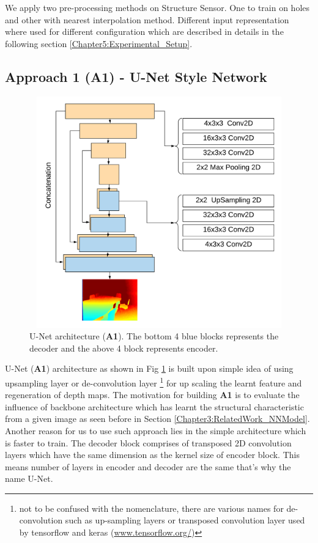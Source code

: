 We apply two pre-processing methods on Structure Sensor. One to train on holes and other with nearest interpolation method. Different input representation where used for different configuration which are described in details in the following section \ref{Chapter5:Experimental_Setup}.

\subsection{Approach 1 (A1) - U-Net Style Network}
\label{Chapter5:A1}
\begin{figure}[h]
    \centering
    \includegraphics[width = 12cm, height = 10cm]{Figures/A1.png}
    \caption{U-Net architecture (\textbf{A1}). The bottom 4 blue blocks represents the decoder and the above 4 block represents encoder. }
    \label{fig:A1-U-NetArchetecture}
\end{figure}{}

U-Net (\textbf{A1}) architecture as shown in Fig \ref{fig:A1-U-NetArchetecture} is built upon simple idea of using upsampling layer or de-convolution layer  \footnote{not to be confused with the nomenclature, there are various names for de-convolution such as up-sampling layers or transposed convolution layer used by tensorflow and keras (\url{www.tensorflow.org/})} for up scaling the learnt feature and regeneration of depth maps. The motivation for building \textbf{A1} is to evaluate the influence of backbone architecture which has learnt the structural characteristic from a given image as seen before in Section \ref{Chapter3:RelatedWork_NNModel}. Another reason for us to use such approach lies in the simple architecture which is faster to train. The decoder block comprises of transposed 2D convolution layers which have the same dimension as the kernel size of encoder block. This means number of layers in encoder and decoder are the same that's why the name U-Net. 


